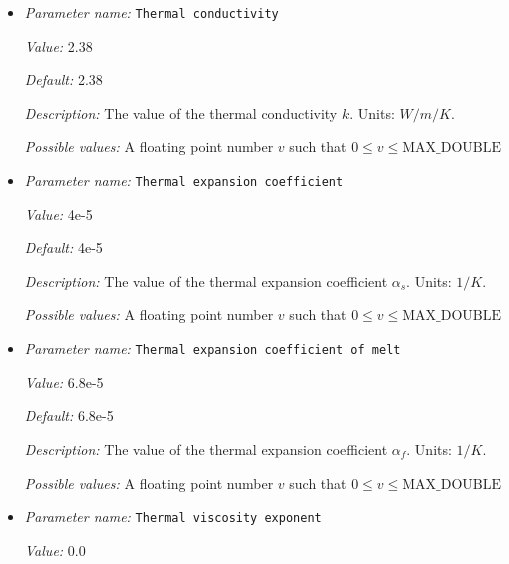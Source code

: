 \begin{itemize}
{\it Possible values:} A floating point number $v$ such that $-\text{MAX\_DOUBLE} \leq v \leq \text{MAX\_DOUBLE}$
\item {\it Parameter name:} {\tt Thermal conductivity}
\label{parameters:Material model/Latent heat melt/Thermal conductivity}


{\it Value:} 2.38


{\it Default:} 2.38


{\it Description:} The value of the thermal conductivity $k$. Units: $W/m/K$.


{\it Possible values:} A floating point number $v$ such that $0 \leq v \leq \text{MAX\_DOUBLE}$
\item {\it Parameter name:} {\tt Thermal expansion coefficient}
\label{parameters:Material model/Latent heat melt/Thermal expansion coefficient}


{\it Value:} 4e-5


{\it Default:} 4e-5


{\it Description:} The value of the thermal expansion coefficient $\alpha_s$. Units: $1/K$.


{\it Possible values:} A floating point number $v$ such that $0 \leq v \leq \text{MAX\_DOUBLE}$
\item {\it Parameter name:} {\tt Thermal expansion coefficient of melt}
\label{parameters:Material model/Latent heat melt/Thermal expansion coefficient of melt}


{\it Value:} 6.8e-5


{\it Default:} 6.8e-5


{\it Description:} The value of the thermal expansion coefficient $\alpha_f$. Units: $1/K$.


{\it Possible values:} A floating point number $v$ such that $0 \leq v \leq \text{MAX\_DOUBLE}$
\item {\it Parameter name:} {\tt Thermal viscosity exponent}
\label{parameters:Material model/Latent heat melt/Thermal viscosity exponent}


{\it Value:} 0.0



\end{itemize}
